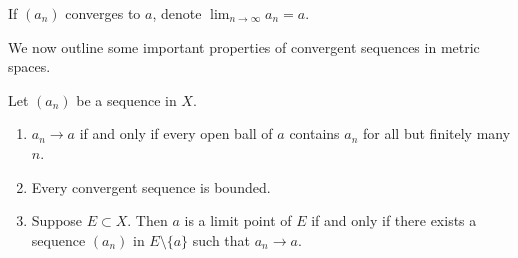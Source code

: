 \begin{notation}
If $(a_n)$ converges to $a$, denote $\displaystyle\lim_{n\to\infty}a_n=a$.
\end{notation}

We now outline some important properties of convergent sequences in metric spaces.

\begin{lemma}
Let $(a_n)$ be a sequence in $X$.
\begin{enumerate}[label=(\roman*)]
\item $a_n\to a$ if and only if every open ball of $a$ contains $a_n$ for all but finitely many $n$.
\item Every convergent sequence is bounded.
\item Suppose $E\subset X$. Then $a$ is a limit point of $E$ if and only if there exists a sequence $(a_n)$ in $E\setminus\{a\}$ such that $a_n\to a$.
\end{enumerate}
\end{lemma}

